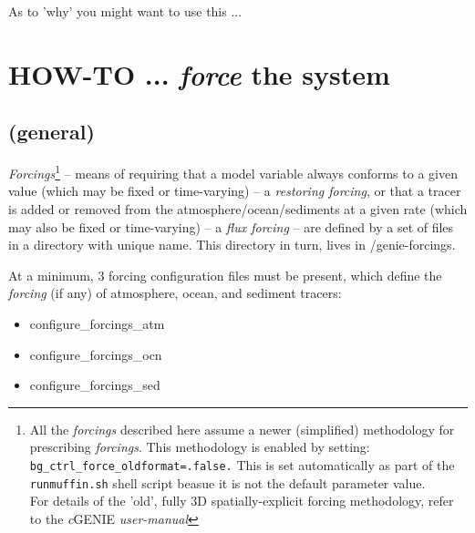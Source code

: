 As to 'why' you might want to use this ...



\newpage


\section{HOW-TO ...  \textit{force} the system}

%
\subsection*{(general)}
\vspace{1mm}

\textit{Forcings}\footnote{All the \textit{forcings} described here assume a newer (simplified) methodology for prescribing \textit{forcings}. This methodology is enabled by setting: \texttt{\scriptsize  bg\_ctrl\_force\_oldformat=.false.} This is set automatically as part of the \texttt{runmuffin.sh} shell script beasue it is not the default parameter value. \\For details of the 'old', fully 3D spatially-explicit forcing methodology, refer to the \textit{c}GENIE \textit{user-manual}} -- means of requiring that a model variable always conforms to a given value (which may be fixed or time-varying) -- a \textit{restoring forcing}, or that a tracer is added or removed from the atmosphere/ocean/sediments at a given rate (which may also be fixed or time-varying) -- a \textit{flux forcing} -- are defined by a set of files in a directory with unique  name. This directory in turn, lives in \textsf{\footnotesize /genie-forcings}.

\vspace{1mm}
At a minimum, 3 forcing configuration files must be present, which define the \textit{forcing} (if any) of atmosphere, ocean, and sediment tracers:

\vspace{1mm}
\begin{itemize}[noitemsep]
\item \textsf{\footnotesize configure\_forcings\_atm}
\item \textsf{\footnotesize configure\_forcings\_ocn}
\item \textsf{\footnotesize configure\_forcings\_sed}
\end{itemize}
\vspace{1mm}

